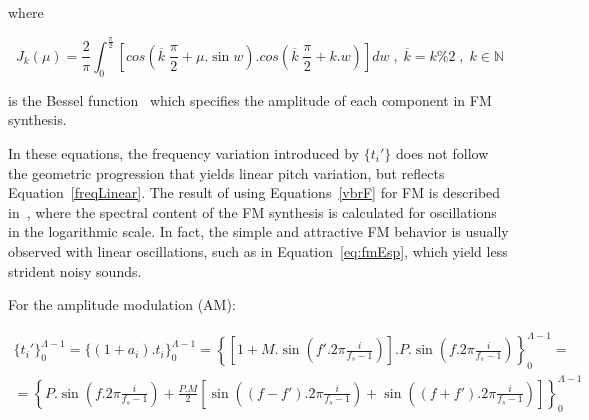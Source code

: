 \noindent where

\begin{equation}\label{eq:Bessel}
J_k(\mu) = \frac{2}{\pi} \int_0^{\frac{\pi}{2}}\left [ cos \left (\overline{k}\;\frac{\pi}{2} + \mu . \sin w \right ) . cos \left ( \overline{k}\;\frac{\pi}{2} + k . w \right ) \right ] dw \;,\; \overline{k} = k \% 2 \;,\; k \in \mathbb{N}
\end{equation}

\noindent is the Bessel function~\cite{BesselCCRMA,JOSFM} which specifies the amplitude of each component in FM synthesis.

In these equations, the frequency variation introduced by $\{t_i'\}$ does not follow the geometric progression that yields linear pitch variation, but reflects Equation~\ref{freqLinear}. The result of using Equations~\ref{vbrF} for FM is described in~\cite{dissertacao}, where the spectral content of the FM synthesis is calculated for oscillations in the logarithmic scale. In fact, the simple and attractive FM behavior is usually observed with linear oscillations, such as in Equation~\ref{eq:fmEsp}, which yield less strident noisy sounds.

For the amplitude modulation (AM):

\begin{equation}\label{eq:specAM}
\begin{split}
\{t_i'\}_0^{\Lambda-1} =\{(1+a_i) . t_i\}_0^{\Lambda-1} = \left \{ \left [ 1+M.\sin \left ( f'.2\pi\frac{i}{f_s -1} \right ) \right] .P .\sin \left ( f.2\pi\frac{i}{f_s -1} \right ) \right \}_0^{\Lambda-1} = \\ 
                        =  \left\{P.\sin \left( f.2\pi\frac{i}{f_s -1}  \right ) +  \frac{P.M}{2} \left [ \sin \left( (f-f').2\pi\frac{i}{f_s -1}  \right )  + \sin \left( (f+f').2\pi\frac{i}{f_s -1}  \right ) \right ] \right \}_0^{\Lambda-1}
\end{split}
\end{equation}


